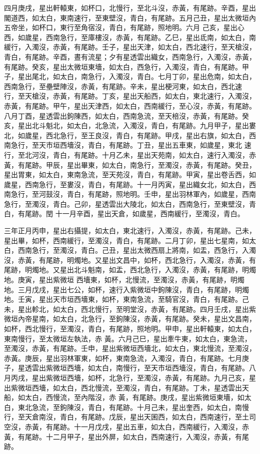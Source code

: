 \begin{pinyinscope}
 四月庚戌，星出軒轅東，如杯口，北慢行，至北斗沒，赤黃，有尾跡。辛酉，星出閣道西，如太白，東南速行，至東壁沒，青白，有尾跡。五月己丑，星出太微垣內五帝坐，如杯口，東行至角宿沒，青白，有尾跡，照地明。六月
 己亥，星出心西，如歲星，西南急行，至庫樓沒，赤黃，有尾跡。乙巳，星出氐南，如太白，南緩行，入濁沒，赤黃，有尾跡。壬子，星出天津，如太白，西北速行，至天槍沒，青白，有尾跡。辛酉，晝有流星；夕有星透雲出織女，西南急行，入濁沒，赤黃，有尾跡。癸亥，星出太微垣東墻，如太白，西急行，入濁沒，青白，有尾跡。甲子，星出尾北，如太白，南急行，入濁沒，青白。七月丁卯，星出危南，如太白，西南急行，至壘壁陣沒，赤黃，有尾跡。辛未，星出梗河東，如太白，西北速
 行，至天槍沒，赤黃，有尾跡。丁亥，星出天船西，如太白，東北速行，入濁沒，赤黃，有尾跡。甲午，星出天津西，如太白，西南緩行，至心沒，赤黃，有尾跡。八月丁酉，星透雲出鉤陳西，如太白，西南急流，至天棓沒，赤黃，有尾跡。癸亥，星出北斗魁北，如太白，北急流，入濁沒，青白，有尾跡。九月甲子，星出婁北，如歲星，西北急行，至王良沒，青白，有尾跡。甲戌，星出右旗，如太白，西南急行，至天市垣西墻沒，青白，有尾跡。丁丑，星出五車東，如歲星，東北
 速行，至北河沒，青白，有尾跡。十月乙未，星出天苑南，如太白，速行入濁沒，赤黃，有尾跡。甲辰，星出畢東，如太白，南急行，至濁沒，赤黃，有尾跡。癸丑，星出胃東，如太白，東南急流，至天苑沒，青白，有尾跡。甲寅，星出卷舌西，如歲星，西南急行，至婁沒，青白，有尾跡。十一月丙寅，星出織女北，如太白，西南急行，至河鼓沒，青白，有尾跡，照地明。壬申，星出羽林軍內，如歲星，西南急行，至濁沒，青白。己卯，星透雲出大陵北，如太白，西南急行，至東壁沒，青白，有尾跡。閏
 十一月辛酉，星出天倉，如歲星，西南緩行，至濁沒，青白。



 三年正月丙申，星出右攝提，如太白，東北速行，入濁沒，赤黃，有尾跡。己未，星出畢，如杯，西南緩行，至濁沒，青白，有尾跡。二月丁卯，星出七星南，如太白，西南急行，至濁沒，青白。己丑，星出太微西扇上將南，如盂，西急行，入濁沒，赤黃，有尾跡，明燭地。又星出文昌中，如杯，西北急行，入濁沒，赤黃，有尾跡，明燭地。又星出北斗魁南，如盂，西北急行，入濁沒，赤黃，有尾跡，明燭地。庚寅，星出紫微垣
 西墻東，如杯，北慢流，至濁沒，赤黃，有尾跡，明燭地。三月戊戌，星出七公，如杯，速行入紫微垣中鉤陳沒，青白，有尾跡，明燭地。壬寅，星出天市垣西墻東，如杯，東南急流，至騎官沒，青白，有尾跡。己未，星出軫北，如太白，西北慢行，至明堂沒，赤黃，有尾跡。四月壬戌，星出紫微垣內帝星南，如太白，北急行，至鉤陳沒，赤黃，有尾跡。癸未，星出文昌南，如杯，西北慢行，至濁沒，青白，有尾跡，照地明。甲申，星出軒轅東，如太白，東南慢行，至太微垣左執法，赤
 黃。六月己巳，星出牽牛東，如太白，東急流，至濁沒，赤黃，有尾跡。壬申，星出紫微垣西墻北，如太白，東北慢流，至濁沒，赤黃。庚辰，星出羽林軍東，如杯，東南急流，入濁沒，青白，有尾跡。七月庚子，星透雲出紫微垣西墻，如太白，南慢行，至天市垣西墻沒，青白，有尾跡。八月丙戌，星出紫微垣西墻，如杯，北急行，至濁沒，赤黃，有尾跡。九月己亥，星出紫微垣西墻，如太白，西北慢流，至濁沒，青白，有尾跡。丁未，星透雲出天船，如太白，西慢流，至內階沒，赤
 黃，有尾跡。庚戌，星出紫微垣東墻，如太白，東北急流，至鉤陳沒，青白，有尾跡。十月己未，星出奎西，如太白，南慢行，至天倉南沒，青白，有尾跡。戊辰，星出天囷西，如太白，西南速行，至土司空沒，赤黃，有尾跡。十一月戊戌，星出五車，如太白，西南緩行，入濁沒，赤黃，有尾跡。十二月甲子，星出外屏，如太白，西南速行，入濁沒，赤黃，有尾跡。




\end{pinyinscope}
